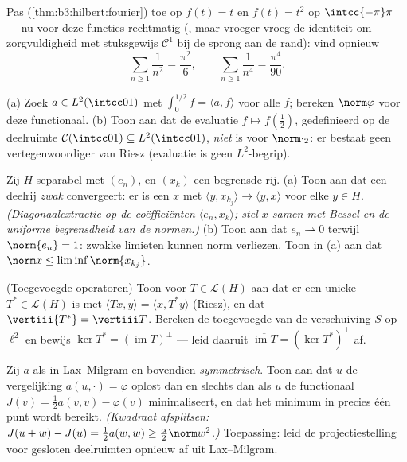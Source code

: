 \begin{exercise}[$\star\star$]\label{exo:b3:hilbert:5}
Pas  (\cref{thm:b3:hilbert:fourier}) toe op $f(t) = t$ en
$f(t) = t^2$ op $\intcc{-\pi}\pi$ --- nu voor deze functies
rechtmatig (, maar vroeger vroeg de identiteit om
zorgvuldigheid met stuksgewijs $\mathcal C^1$ bij de sprong aan
de rand): vind opnieuw
\[
\sum_{n\geq1}\frac1{n^2} = \frac{\pi^2}6,
\qquad
\sum_{n\geq1}\frac1{n^4} = \frac{\pi^4}{90} .
\]
\end{exercise}

\begin{exercise}[$\star\star$]\label{exo:b3:hilbert:6}
(a) Zoek $a \in L^2(\intcc01)$ met $\int_0^{1/2}f = \langle a,
f\rangle$ voor alle $f$; bereken $\norm\varphi$ voor deze
functionaal.
(b) Toon aan dat de evaluatie $f \mapsto f(\frac12)$,
gedefinieerd op de deelruimte $\mathcal C(\intcc01) \subseteq
L^2(\intcc01)$, \emph{niet}  is voor $\norm\cdot_2$: er
bestaat geen vertegenwoordiger van Riesz (evaluatie is geen
$L^2$-begrip).
\end{exercise}

\begin{exercise}[$\star\star\star$]\label{exo:b3:hilbert:7}
Zij $H$ separabel met  $(e_n)$, en $(x_k)$ een
begrensde rij.
(a) Toon aan dat een deelrij \emph{zwak} convergeert: er is een
$x$ met $\langle y, x_{k_j}\rangle \to \langle y, x\rangle$ voor
elke $y \in H$. \emph{(Diagonaalextractie op de coëfficiënten
$\langle e_n, x_k\rangle$; stel $x$ samen met Bessel en de
uniforme begrensdheid van de normen.)}
(b) Toon aan dat $e_n \rightharpoonup 0$ terwijl $\norm{e_n} =
1$: zwakke limieten kunnen norm verliezen. Toon in (a) aan dat
$\norm x \leq \liminf\norm{x_{k_j}}$.
\end{exercise}

\begin{exercise}[$\star\star$]\label{exo:b3:hilbert:8}
(Toegevoegde operatoren) Toon voor $T \in \mathcal L(H)$ aan dat
er een unieke $T^* \in \mathcal L(H)$ is met $\langle Tx,
y\rangle = \langle x, T^*y\rangle$ (Riesz), en dat $\vertiii{T^*}
= \vertiii T$. Bereken de toegevoegde van de verschuiving $S$ op
$\ell^2$ en bewijs $\ker T^* = (\operatorname{im}T)^\perp$ ---
leid daaruit $\overline{\operatorname{im}T} = (\ker T^*)^\perp$
af.
\end{exercise}

\begin{exercise}[$\star\star$]\label{exo:b3:hilbert:9}
Zij $a$ als in Lax--Milgram en bovendien \emph{symmetrisch}. Toon
aan dat $u$ de vergelijking $a(u, \cdot) = \varphi$ oplost dan en
slechts dan als $u$ de functionaal $J(v) = \frac12a(v, v) -
\varphi(v)$ minimaliseert, en dat het minimum in precies één punt
wordt bereikt. \emph{(Kwadraat afsplitsen: $J(u + w) - J(u) =
\frac12a(w,w) \geq \frac\alpha2\norm w^2$.)} Toepassing: leid de
projectiestelling voor gesloten deelruimten opnieuw af uit
Lax--Milgram.
\end{exercise}

